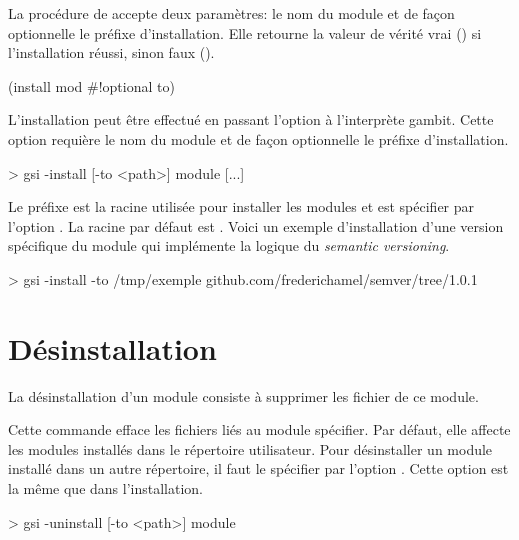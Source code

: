 La procédure  de  accepte deux paramètres:
le nom du module et de façon optionnelle le préfixe d'installation. Elle
retourne la valeur de vérité vrai () si l'installation réussi,
sinon faux ().
\begin{center}
  \begin{mplisting}{0.4}
(install mod #!optional to)
\end{mplisting}
\end{center}

L'installation peut être effectué en passant l'option 
à l'interprète gambit. Cette option requière le nom du module et
de façon optionnelle le préfixe d'installation.
\begin{center}
  \begin{mplisting}{0.8}
> gsi -install [-to <path>] module [...]
\end{mplisting}
\end{center}
Le préfixe  est la racine utilisée pour installer les modules
et est spécifier par l'option .  La racine par défaut est
. Voici un exemple d'installation d'une version spécifique du module
 qui implémente la logique du \textit{semantic versioning}.

\begin{center}
  \begin{mplisting}{1}
> gsi -install -to /tmp/exemple github.com/frederichamel/semver/tree/1.0.1
\end{mplisting}
\end{center}

\section{Désinstallation}

La désinstallation d'un module consiste à supprimer les fichier
de ce module.

Cette commande efface les fichiers liés au module spécifier.
Par défaut, elle affecte les modules installés dans le répertoire
utilisateur. Pour désinstaller un module installé dans un autre
répertoire, il faut le spécifier par l'option . Cette option
est la même que dans l'installation.

\begin{center}
  \begin{mplisting}{0.8}
> gsi -uninstall [-to <path>] module
\end{mplisting}
\end{center}

